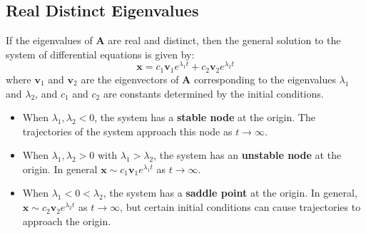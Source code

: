 \documentclass{article}
\begin{document}
\subsection{Real Distinct Eigenvalues}
If the eigenvalues of \(\symbf{A}\) are real and distinct, then the
general solution to the system of differential equations is given by:
\begin{equation*}
    \symbf{x} = c_1 \symbf{v}_1 e^{\lambda_1 t} + c_2 \symbf{v}_2 e^{\lambda_2 t}
\end{equation*}
where \(\symbf{v}_1\) and \(\symbf{v}_2\) are the eigenvectors of
\(\symbf{A}\) corresponding to the eigenvalues \(\lambda_1\) and
\(\lambda_2\), and \(c_1\) and \(c_2\) are constants determined by the
initial conditions.
\begin{itemize}
    \item When \(\lambda_1, \lambda_2 < 0\), the system has a
          \textbf{stable node} at the origin. The trajectories of the
          system approach this node as \(t \to \infty\).
    \item When \(\lambda_1, \lambda_2 > 0\) with \(\lambda_1 >
          \lambda_2\), the system has an \textbf{unstable node} at the
          origin. In general \(\symbf{x} \sim c_1 \symbf{v}_1
          e^{\lambda_1 t}\) as \(t \to \infty\).
    \item When \(\lambda_1 < 0 < \lambda_2\), the system has a
          \textbf{saddle point} at the origin. In general, \(\symbf{x}
          \sim c_2 \symbf{v}_2 e^{\lambda_2 t}\) as \(t \to \infty\),
          but certain initial conditions can cause trajectories to
          approach the origin.
\end{itemize}
\end{document}
